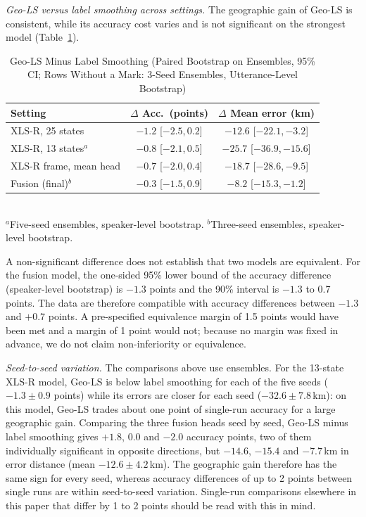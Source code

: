 \documentclass[conference]{IEEEtran}
\newcommand{\ci}[2]{\scriptsize[#1,\,#2]}
\begin{document}
\textit{Geo-LS versus label smoothing across settings.} The geographic gain of Geo-LS is consistent, while its accuracy cost varies and is not significant on the strongest model (Table~\ref{tab:geovsls}).

\begin{table}[t]
\centering
\caption{Geo-LS Minus Label Smoothing (Paired Bootstrap on Ensembles, 95\% CI; Rows Without a Mark: 3-Seed Ensembles, Utterance-Level Bootstrap)}
\label{tab:geovsls}
\setlength{\tabcolsep}{3pt}
\begin{tabular}{@{}lcc@{}}
\toprule
Setting & $\Delta$ Acc.\ (points) & $\Delta$ Mean error (km) \\
\midrule
XLS-R, 25 states & $-1.2$ \ci{$-2.5$}{$0.2$} & $-12.6$ \ci{$-22.1$}{$-3.2$} \\
XLS-R, 13 states$^{a}$ & $-0.8$ \ci{$-2.1$}{$0.5$} & $-25.7$ \ci{$-36.9$}{$-15.6$} \\
XLS-R frame, mean head & $-0.7$ \ci{$-2.0$}{$0.4$} & $-18.7$ \ci{$-28.6$}{$-9.5$} \\
Fusion (final)$^{b}$ & $-0.3$ \ci{$-1.5$}{$0.9$} & $-8.2$ \ci{$-15.3$}{$-1.2$} \\
\bottomrule
\end{tabular}\\[2pt]
{\footnotesize $^{a}$Five-seed ensembles, speaker-level bootstrap. $^{b}$Three-seed ensembles, speaker-level bootstrap.}
\end{table}

A non-significant difference does not establish that two models are equivalent. For the fusion model, the one-sided 95\% lower bound of the accuracy difference (speaker-level bootstrap) is $-1.3$ points and the 90\% interval is $-1.3$ to 0.7 points. The data are therefore compatible with accuracy differences between $-1.3$ and $+0.7$ points. A pre-specified equivalence margin of 1.5 points would have been met and a margin of 1 point would not; because no margin was fixed in advance, we do not claim non-inferiority or equivalence.

\textit{Seed-to-seed variation.} The comparisons above use ensembles. For the 13-state XLS-R model, Geo-LS is below label smoothing for each of the five seeds ($-1.3 \pm 0.9$ points) while its errors are closer for each seed ($-32.6 \pm 7.8$\,km): on this model, Geo-LS trades about one point of single-run accuracy for a large geographic gain. Comparing the three fusion heads seed by seed, Geo-LS minus label smoothing gives $+1.8$, $0.0$ and $-2.0$ accuracy points, two of them individually significant in opposite directions, but $-14.6$, $-15.4$ and $-7.7$\,km in error distance (mean $-12.6 \pm 4.2$\,km). The geographic gain therefore has the same sign for every seed, whereas accuracy differences of up to 2 points between single runs are within seed-to-seed variation. Single-run comparisons elsewhere in this paper that differ by 1 to 2 points should be read with this in mind.
\end{document}
